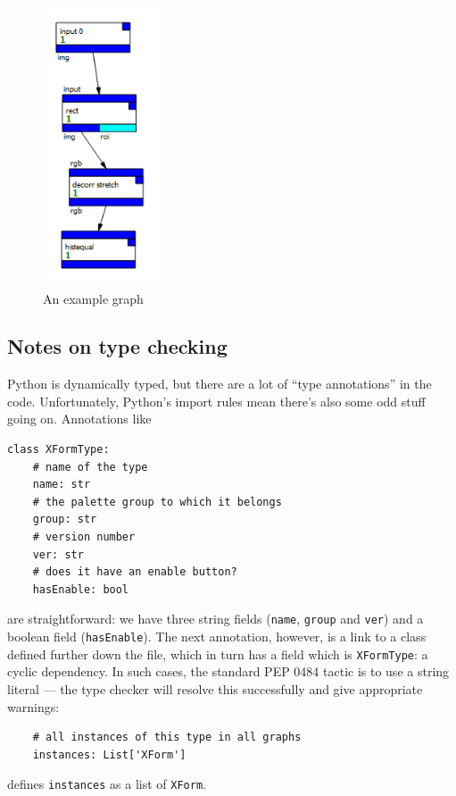 \begin{figure}[ht]
\center
\includegraphics[width=1.4in]{graph.png}
\caption{An example graph}
\label{graph.png}
\end{figure}


\subsection{Notes on type checking}
Python is dynamically typed, but there are a lot of ``type annotations''
in the code. Unfortunately, Python's import rules mean there's also some
odd stuff going on. Annotations like
\begin{lstlisting}
class XFormType:
    # name of the type
    name: str
    # the palette group to which it belongs
    group: str
    # version number
    ver: str
    # does it have an enable button?
    hasEnable: bool
\end{lstlisting}
are straightforward: we have three
string fields (\texttt{name}, \texttt{group} and \texttt{ver}) and
a boolean field (\texttt{hasEnable}). The next annotation, however,
is a link to a class defined further down the file, which in turn has
a field which is \texttt{XFormType}: a cyclic dependency. In such cases,
the standard PEP 0484 tactic is to use a string literal --- the type
checker will resolve this successfully and give appropriate warnings:
\begin{lstlisting}
    # all instances of this type in all graphs
    instances: List['XForm']
\end{lstlisting}
defines \texttt{instances} as a list of \texttt{XForm}.

